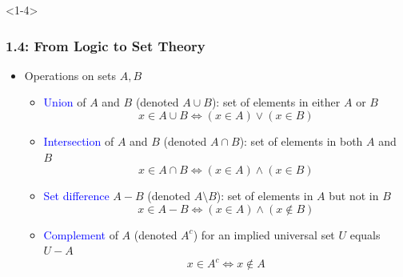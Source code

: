 \documentclass[10pt,english,aspectratio=169]{beamer}
\begin{document}
\begin{frame}<1-4> \frametitle{1.4: From Logic to Set Theory}

\begin{itemize}
\setlength\itemsep{3mm}
\item<1-> Operations on sets $A,B$ \vspace{1mm}
\begin{itemize} 
  \setlength\itemsep{1.5mm}
  \item<1-> \textcolor{blue}{Union} of $A$ and $B$ (denoted $A\cup B$): set of elements in either $A$ or $B$
\[ x\in A\cup B \Leftrightarrow (x\in A)\vee (x\in B) \]
  \item<2-> \textcolor{blue}{Intersection} of $A$ and $B$ (denoted $A\cap B$): set of elements in both $A$ and $B$
\[ x\in A\cap B \Leftrightarrow (x\in A)\wedge (x\in B) \]
  \item<3-> \textcolor{blue}{Set difference} $A-B$ (denoted  $A \setminus \!B$): set of elements in $A$ but not in $B$
\[ x\in A-B \Leftrightarrow (x\in A)\wedge (x\notin B) \]
  \item<4-> \textcolor{blue}{Complement} of $A$ (denoted $A^c$) for an implied universal set $U$ equals $U\!-\!A\!\!\!\!\!\!\!$
  \[ x\in A^c \Leftrightarrow x \notin A \]
\end{itemize}


\end{itemize}


\end{frame}
\end{document}
